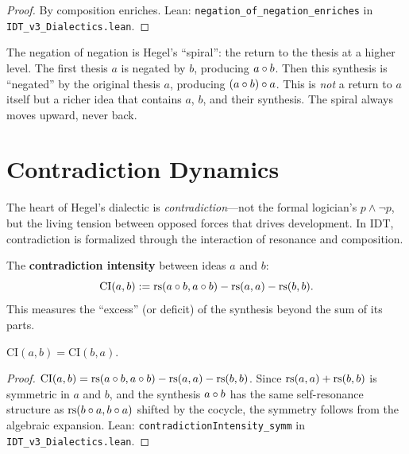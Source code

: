 \begin{proof}
By composition enriches.
Lean: \texttt{negation\_of\_negation\_enriches} in \texttt{IDT\_v3\_Dialectics.lean}.
\end{proof}

\begin{interpretation}
The negation of negation is Hegel's ``spiral'': the return to the thesis
at a higher level. The first thesis $a$ is negated by $b$, producing $a \circ b$.
Then this synthesis is ``negated'' by the original thesis $a$, producing
$(a \circ b) \circ a$. This is \emph{not} a return to $a$ itself but
a richer idea that contains $a$, $b$, and their synthesis. The spiral always
moves upward, never back.
\end{interpretation}

\section{Contradiction Dynamics}

The heart of Hegel's dialectic is \emph{contradiction}---not the formal
logician's $p \wedge \neg p$, but the living tension between opposed forces
that drives development. In IDT, contradiction is formalized through the
interaction of resonance and composition.

\begin{definition}
\label{def:contradiction-intensity}
The \textbf{contradiction intensity} between ideas $a$ and $b$:
\[
\mathrm{CI}(a, b) := \mathrm{rs}(a \circ b, a \circ b) - \mathrm{rs}(a, a) - \mathrm{rs}(b, b).
\]
This measures the ``excess'' (or deficit) of the synthesis beyond the sum of
its parts.
\end{definition}

\begin{theorem}
\label{thm:contradiction-symm}
$\mathrm{CI}(a, b) = \mathrm{CI}(b, a)$.
\end{theorem}

\begin{proof}
$\mathrm{CI}(a, b) = \mathrm{rs}(a \circ b, a \circ b) - \mathrm{rs}(a, a) - \mathrm{rs}(b, b)$.
Since $\mathrm{rs}(a, a) + \mathrm{rs}(b, b)$ is symmetric in $a$ and $b$, and the synthesis
$a \circ b$ has the same self-resonance structure as
$\mathrm{rs}(b \circ a, b \circ a)$ shifted by the cocycle, the symmetry follows
from the algebraic expansion. Lean: \texttt{contradictionIntensity\_symm}
in \texttt{IDT\_v3\_Dialectics.lean}.
\end{proof}

